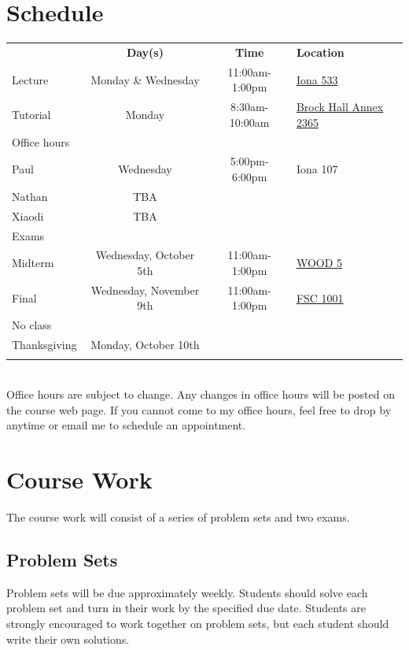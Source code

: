 \documentclass[10pt]{article}
\begin{document}
\section{Schedule}
\begin{tabular}{l c c l}
  \hline 
  & \textbf{Day(s)} & \textbf{Time} & \textbf{Location} \\
  Lecture & Monday \& Wednesday & 11:00am-1:00pm & \href{https://ssc.adm.ubc.ca/classroomservices/function/viewlocation?userEvent=ShowLocation&buildingID=IONA&roomID=533}{Iona 533} \\
  Tutorial & Monday & 8:30am-10:00am &
  \href{https://ssc.adm.ubc.ca/classroomservices/function/viewlocation?userEvent=ShowLocation&buildingID=BRKX&roomID=2365}
  {Brock Hall Annex 2365}  \\
  Office hours \\
  \; Paul & Wednesday & 5:00pm-6:00pm & Iona 107 \\
  \; Nathan & TBA & & \\ 
  \; Xiaodi & TBA & & \\ \hline
  Exams \\
  \; Midterm & Wednesday, October 5th & 11:00am-1:00pm &
                                                         \href{https://ssc.adm.ubc.ca/classroomservices/function/viewlocation?userEvent=ShowLocation&buildingID=WOOD&roomID=5}{WOOD 5} \\
  \; Final & Wednesday, November 9th & 11:00am-1:00pm &
                                                        \href{https://ssc.adm.ubc.ca/classroomservices/function/viewlocation?userEvent=ShowLocation&buildingID=FSC&roomID=1001}{FSC 1001} \\
  No class \\
  \; Thanksgiving & Monday, October 10th \\
  \\ \hline 
\end{tabular} \\
Office hours are subject to change. Any changes in office hours will
be posted on the course web page. If you cannot come to my office
hours, feel free to drop by anytime or email me to schedule an
appointment.  

\section{Course Work}

The course work will consist of a series of problem sets and two
exams. 

\subsection{Problem Sets}
Problem sets will be due approximately weekly.  Students should solve
each problem set and turn in their work by the specified due
date. Students are strongly encouraged to work together on problem
sets, but each student should write their own solutions.
\end{document}
